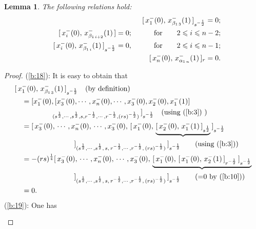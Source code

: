 \documentclass{amsproc}
\newtheorem{lemm}[theo]{Lemma}
\theoremstyle{remark}
\numberwithin{equation}{section}
\begin{document}
\begin{lemm}{\label{d:16} The following relations hold:
\begin{eqnarray}
&&{\label{b:18}[\,x_1^-{(0)},\, x_{\beta_{1\,3}}^-(1)\,]_{s^{-\frac{1}{2}}}=0; }\\
&&{\label{b:19}[\,x_i^-{(0)},\, x_{\beta_{1\,i+2}}^-(1)\,]=0; \qquad\quad \hbox{for} \qquad 2\leqslant i \leqslant n-2;}\\
&&{\label{b:20}[\,x_i^-{(0)},\, x_{\beta_{1\,i}}^-(1)\,]_{s^{-\frac{1}{2}}}=0, \qquad\quad \hbox{for} \qquad  2\leqslant i \leqslant n-1;} \\
&&{\label{b:21}[\,x_n^-{(0)},\, x_{\alpha_{1\,n}}^-(1)\,]_r=0.}
\end{eqnarray}}
\end{lemm}
\begin{proof} (\ref{b:18}): It is easy to obtain that
\begin{eqnarray*}
\begin{split}
&[\,x_1^-{(0)},\, x_{\beta_{1\,3}}^-(1)\,]_{s^{-\frac{1}{2}}}
\quad {\hbox{(by definition)}}\\
&\quad=[x_1^-(0), [x_{3}^-(0), \cdots,
x_{n}^-(0), \cdots, x_3^-(0), x_2^-(0), x_{1}^-(1)]\\
&\quad\hskip1.5cm _{(s^{\frac{1}{2}}, \cdots, s^{\frac{1}{2}}, s
, r^{-\frac{1}{2}}, \cdots, r^{-\frac{1}{2}}, (rs)^{-\frac{1}{2}})}\,]_{s^{-\frac{1}{2}}}\quad {\hbox{(using (\ref{b:3}) )}}\\
&\quad=[\,x_{3}^-(0),\,\cdots, x_{n}^-(0),\,\cdots,x_3^-(0),\,
[\,x_1^-(0),\,\underbrace{[\,x_2^-(0),\,x_{1}^-(1)\,]_{s^{\frac{1}{2}}}}
\,]_{s^{-\frac{1}{2}}}\\
&\quad\hskip2.5cm\,]_{(s^{\frac{1}{2}},\cdots,s^{\frac{1}{2}},\,s
,\,r^{-\frac{1}{2}},\cdots,r^{-\frac{1}{2}},\,(rs)^{-\frac{1}{2}})}
\,]_{s^{-\frac{1}{2}}}\qquad {\hbox{(using (\ref{b:3}))}}\\
&\quad=-(rs)^{\frac{1}{4}}[\,x_{3}^-(0),\,\cdots, x_{n}^-(0),\,\cdots,x_3^-(0),\,
\underbrace{[\,x_1^-(0),\,[\,x_1^-(0),\,x_{2}^-(1)\,]_{r^{-\frac{1}{2}}}
\,]_{s^{-\frac{1}{2}}}}\\
&\quad\hskip2.5cm\,]_{(s^{\frac{1}{2}},\cdots,s^{\frac{1}{2}},\,s
,\,r^{-\frac{1}{2}},\cdots,r^{-\frac{1}{2}},\,(rs)^{-\frac{1}{2}})}
\,]_{s^{-\frac{1}{2}}}\qquad {\hbox{(=0 by (\ref{b:10}))}}\\
&\quad=0.
\end{split}
\end{eqnarray*}
(\ref{b:19}): One has
\begin{eqnarray*}
\begin{split}

\end{split}
\end{eqnarray*}
\end{proof}
\end{document}
